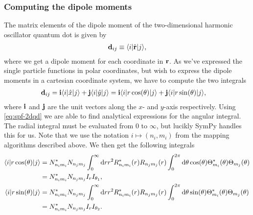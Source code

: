         \subsubsection{Computing the dipole moments}
            The matrix elements of the dipole moment of the two-dimensional
            harmonic oscillator quantum dot is given by
            \begin{align}
                \vf{d}_{ij}
                \equiv \bra{i}\position[\vf{r}]\ket{j},
            \end{align}
            where we get a dipole moment for each coordinate in $\vf{r}$. As
            we've expressed the single particle functions in polar coordinates,
            but wish to express the dipole moments in a cartesian coordinate
            system, we have to compute the two integrals
            \begin{align}
                \vf{d}_{ij}
                &= \vf{i}\bra{i} \position\ket{j}
                + \vf{j}\bra{i} \position[y]\ket{j}
                = \vf{i}\bra{i} r \cos(\theta)\ket{j}
                + \vf{j}\bra{i} r \sin(\theta)\ket{j},
            \end{align}
            where $\vf{i}$ and $\vf{j}$ are the unit vectors along the $x$- and
            $y$-axis respectively.  Using \autoref{eq:spf-2dqd} we are able to
            find analytical expressions for the angular integral. The radial
            integral must be evaluated from $0$ to $\infty$, but lucikly SymPy
            \cite{sympy} handles this for us. Note that we use the notation $i
            \mapsto (n_i, m_i)$ from the mapping algorithms described above. We
            then get the following integrals
            \begin{align}
                \bra{i} r \cos(\theta) \ket{j}
                &= N^{*}_{n_i m_i} N_{n_j m_j}
                \int_{0}^{\infty} \dd r r^2
                R_{n_i m_i}^{*}(r) R_{n_j m_j}(r)
                \int_{0}^{2\pi} \dd \theta \cos(\theta)
                \Theta_{m_i}^{*}(\theta) \Theta_{m_j}(\theta)
                \\
                &= N^{*}_{n_i m_i} N_{n_j m_j} I_{r} I_{\theta_1},
                \\
                \bra{i} r \sin(\theta) \ket{j}
                &= N^{*}_{n_i m_i} N_{n_j m_j}
                \int_{0}^{\infty} \dd r r^2
                R_{n_i m_i}^{*}(r) R_{n_j m_j}(r)
                \int_{0}^{2\pi} \dd \theta \sin(\theta)
                \Theta_{m_i}^{*}(\theta) \Theta_{m_j}(\theta)
                \\
                &= N^{*}_{n_i m_i} N_{n_j m_j} I_{r} I_{\theta_2}.
            \end{align}
